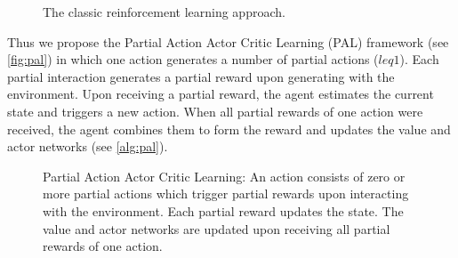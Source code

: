 \documentclass[sigconf]{acmart}
\begin{document}
\begin{figure}

\caption{The classic reinforcement learning approach.\protect\footnotemark}
\label{fig:reinforcement}
\end{figure}

Thus we propose the Partial Action Actor Critic Learning (PAL) framework (see \autoref{fig:pal}) in which one action generates a number of partial actions ($leq 1$). Each partial interaction generates a partial reward upon generating with the environment. Upon receiving a partial reward, the agent estimates the current state and triggers a new action. When all partial rewards of one action were received, the agent combines them to form the reward and updates the value and actor networks (see \autoref{alg:pal}). 

\begin{figure}

\caption{Partial Action Actor Critic Learning: An action consists of zero or more partial actions which trigger partial rewards upon interacting with the environment. Each partial reward updates the state. The value and actor networks are updated upon receiving all partial rewards of one action.\protect\footnotemark}
\label{fig:pal}
\end{figure}
\end{document}

